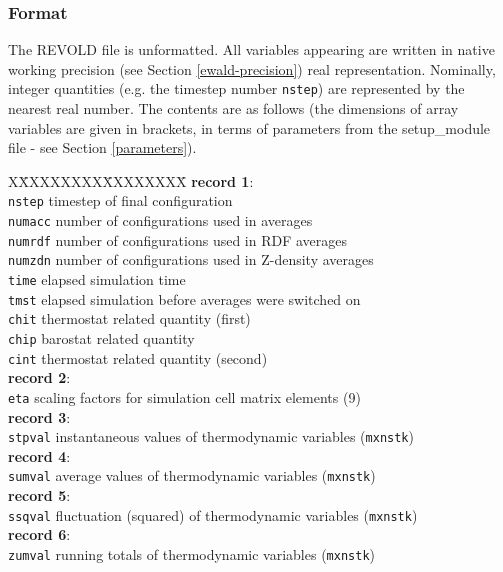 \subsubsection{Format}

The REVOLD file is unformatted.  All variables appearing are
written in native working precision (see Section
\ref{ewald-precision}) real representation. Nominally, integer
quantities (e.g. the timestep number {\tt nstep}) are represented
by the nearest real number.  The contents are as follows (the
dimensions of array variables are given in brackets, in terms of
parameters from the {\sc setup\_module} file - see Section
\ref{parameters}).

\begin{tabbing}
X\=XXXXXXXX\=XXXXXXXX\=\kill
{\bf record 1}: \\
\> {\tt nstep}  \> timestep of final configuration \\
\> {\tt numacc} \> number of configurations used in averages \\
\> {\tt numrdf} \> number of configurations used in RDF averages \\
\> {\tt numzdn} \> number of configurations used in Z-density averages \\
\> {\tt time}   \> elapsed simulation time \\
\> {\tt tmst}   \> elapsed simulation before averages were switched on \\
\> {\tt chit}   \> thermostat related quantity (first) \\
\> {\tt chip}   \> barostat related quantity \\
\> {\tt cint}   \> thermostat related quantity (second) \\
{\bf record 2}: \\
\> {\tt eta}    \>  scaling factors for simulation cell matrix elements (9) \\
{\bf record 3}: \\
\> {\tt stpval} \>  instantaneous values of thermodynamic variables ({\tt mxnstk}) \\
{\bf record 4}: \\
\> {\tt sumval} \>  average values of thermodynamic variables ({\tt mxnstk}) \\
{\bf record 5}: \\
\> {\tt ssqval} \>  fluctuation (squared) of thermodynamic variables ({\tt mxnstk}) \\
{\bf record 6}: \\
\> {\tt zumval} \>  running totals of thermodynamic variables ({\tt mxnstk}) \\

\end{tabbing}
